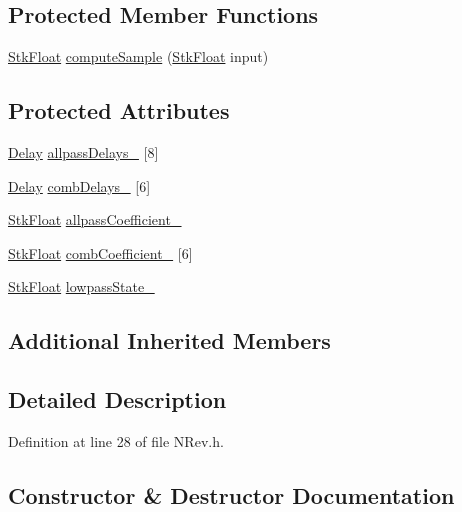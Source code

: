 \subsection*{Protected Member Functions}
\begin{DoxyCompactItemize}
\item 
\hyperlink{namespace_nyq_a044fa20a706520a617bbbf458a7db7e4}{Stk\+Float} \hyperlink{class_nyq_1_1_n_rev_afc8f64be987bd6b9ab0b06c752c1d62e}{compute\+Sample} (\hyperlink{namespace_nyq_a044fa20a706520a617bbbf458a7db7e4}{Stk\+Float} input)
\end{DoxyCompactItemize}
\subsection*{Protected Attributes}
\begin{DoxyCompactItemize}
\item 
\hyperlink{class_nyq_1_1_delay}{Delay} \hyperlink{class_nyq_1_1_n_rev_ad10639e7e0e68eab02687d764acca17a}{allpass\+Delays\+\_\+} \mbox{[}8\mbox{]}
\item 
\hyperlink{class_nyq_1_1_delay}{Delay} \hyperlink{class_nyq_1_1_n_rev_a5b5befa663dee792beab473ba1d775bd}{comb\+Delays\+\_\+} \mbox{[}6\mbox{]}
\item 
\hyperlink{namespace_nyq_a044fa20a706520a617bbbf458a7db7e4}{Stk\+Float} \hyperlink{class_nyq_1_1_n_rev_a55b4448542b083a24e53bdcea85460cc}{allpass\+Coefficient\+\_\+}
\item 
\hyperlink{namespace_nyq_a044fa20a706520a617bbbf458a7db7e4}{Stk\+Float} \hyperlink{class_nyq_1_1_n_rev_a18661b19e8b2a7205be19068a5a7f395}{comb\+Coefficient\+\_\+} \mbox{[}6\mbox{]}
\item 
\hyperlink{namespace_nyq_a044fa20a706520a617bbbf458a7db7e4}{Stk\+Float} \hyperlink{class_nyq_1_1_n_rev_ab2dad2361fe84bc43a7f2c380f778570}{lowpass\+State\+\_\+}
\end{DoxyCompactItemize}
\subsection*{Additional Inherited Members}


\subsection{Detailed Description}


Definition at line 28 of file N\+Rev.\+h.



\subsection{Constructor \& Destructor Documentation}
